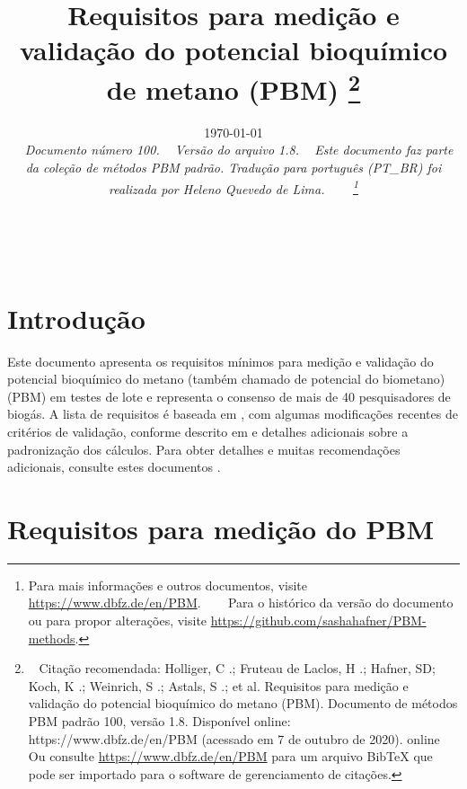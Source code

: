 \documentclass[]{article}
\title{Requisitos para medição e validação do potencial bioquímico de metano (PBM) \footnote{
  Citação recomendada: 
Holliger, C .; Fruteau de Laclos, H .; Hafner, SD; Koch, K .; Weinrich, S .; Astals, S .; et al. Requisitos para medição e validação do potencial bioquímico do metano (PBM). Documento de métodos PBM padrão 100, versão 1.8. Disponível online: https://www.dbfz.de/en/PBM (acessado em 7 de outubro de 2020).
\new online
  Ou consulte \url{https://www.dbfz.de/en/PBM} para um arquivo BibTeX que pode ser importado para o software de gerenciamento de citações.
}}
\date{\today \\
\bigskip
\textit{
  Documento número 100.
  Versão do arquivo 1.8. 
  Este documento faz parte da coleção de métodos PBM padrão.
  Tradução para português (PT_BR) foi realizada por Heleno Quevedo de Lima.
    \footnote{Para mais informações e outros documentos, visite \url{https://www.dbfz.de/en/PBM}. 
    Para o histórico da versão do documento ou para propor alterações, visite \url{https://github.com/sashahafner/PBM-methods}.}
}
}
\begin{document}
\maketitle
 
\section{Introdução}
Este documento apresenta os requisitos mínimos para medição e validação do potencial bioquímico do metano (também chamado de potencial do biometano) (PBM) em testes de lote e representa o consenso de mais de 40 pesquisadores de biogás.
A lista de requisitos é baseada em \citet{holligerStandardizationBiomethanePotential2016}, com algumas modificações recentes de critérios de validação, conforme descrito em \citet{hafnerImprovingInterlaboratoryReproducibility2020} e detalhes adicionais sobre a padronização dos cálculos.
Para obter detalhes e muitas recomendações adicionais, consulte estes documentos \citep{holligerStandardizationBiomethanePotential2016, hafnerImprovingInterlaboratoryReproducibility2020}.
 
\section{Requisitos para medição do PBM}
\label{sec: requisitos}
\end{document}
